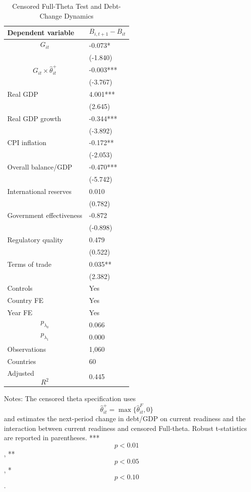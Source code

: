 \begin{table}[H]\centering
\begin{threeparttable}
\caption{Censored Full-Theta Test and Debt-Change Dynamics}
\label{tab:censored_fulltheta_debt}
\scriptsize
\begin{tabularx}{\textwidth}{lY}
\toprule
Dependent variable & $$B_{i,t+1}-B_{it}$$ \\
\midrule
$$G_{it}$$ & -0.073* \\
 & (-1.840) \\
$$G_{it}\times\widehat{\theta}^{+}_{it}$$ & -0.003*** \\
 & (-3.767) \\
Real GDP & 4.001*** \\
 & (2.645) \\
Real GDP growth & -0.344*** \\
 & (-3.892) \\
CPI inflation & -0.172** \\
 & (-2.053) \\
Overall balance/GDP & -0.470*** \\
 & (-5.742) \\
International reserves & 0.010 \\
 & (0.782) \\
Government effectiveness & -0.872 \\
 & (-0.898) \\
Regulatory quality & 0.479 \\
 & (0.522) \\
Terms of trade & 0.035** \\
 & (2.382) \\
\midrule
Controls & Yes \\
Country FE & Yes \\
Year FE & Yes \\
$$p_{\lambda_0}$$ & 0.066 \\
$$p_{\lambda_1}$$ & 0.000 \\
Observations & 1,060 \\
Countries & 60 \\
Adjusted $$R^2$$ & 0.445 \\
\bottomrule
\end{tabularx}
\begin{tablenotes}[flushleft]\footnotesize
\item Notes: The censored theta specification uses $$\widehat{\theta}^{+}_{it}=\max\{\widehat{\theta}^{F}_{it},0\}$$ and estimates the next-period change in debt/GDP on current readiness and the interaction between current readiness and censored Full-theta. Robust t-statistics are reported in parentheses. *** $$p<0.01$$, ** $$p<0.05$$, * $$p<0.10$$.
\end{tablenotes}
\end{threeparttable}
\end{table}
